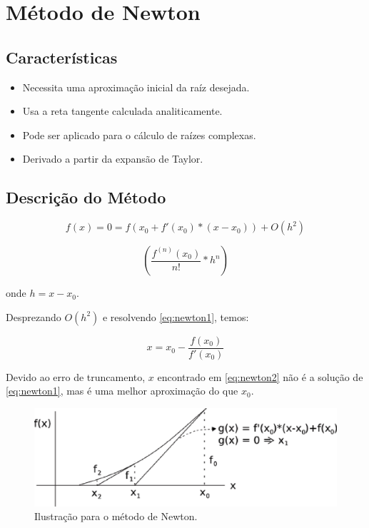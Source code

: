 \section{Método de Newton}

\subsection{Características}

\begin{itemize}
 \item Necessita uma aproximação inicial da raíz desejada.
 \item Usa a reta tangente calculada analiticamente.
 \item Pode ser aplicado para o cálculo de raízes complexas.
 \item Derivado a partir da expansão de Taylor.
\end{itemize}

\subsection{Descrição do Método}

\begin{equation}
 \label{eq:newton1}
 f(x) = 0 = f(x_{0} + f'(x_{0}) \ast (x - x_{0})) + O(h^{2})
\end{equation}

\[
 \displaystyle \left( \frac{f^{(n)}(x_{0})}{n!} \ast h^{n} \right)
\]

onde $h = x - x_{0}$.

Desprezando $O(h^{2})$ e resolvendo \ref{eq:newton1}, temos:

\begin{equation}
 \label{eq:newton2}
 x = x_{0} - \frac{f(x_{0})}{f'(x_{0})}
\end{equation}

Devido ao erro de truncamento, $x$ encontrado em \ref{eq:newton2} não é a solução de \ref{eq:newton1}, mas é uma melhor aproximação do que $x_{0}$.

\begin{figure}[htb]
  \setlength{\abovecaptionskip}{20pt}
  \centering
  \includegraphics[scale=0.8]{capitulos/capitulo1/figuras/newton1.eps}
  \caption{Ilustração para o método de Newton.}
  \label{fig:newton1}
\end{figure}

